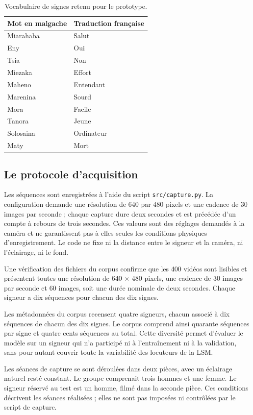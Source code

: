 \begin{table}[ht]
\centering
\small
\caption{Vocabulaire de signes retenu pour le prototype.}
\label{tab:lexique-lsm}
\begin{tabular}{|l|l|}
\hline
Mot en malgache & Traduction française \\
\hline
Miarahaba & Salut \\
Eny & Oui \\
Tsia & Non \\
Miezaka & Effort \\
Maheno & Entendant \\
Marenina & Sourd \\
Mora & Facile \\
Tanora & Jeune \\
Solosaina & Ordinateur \\
Maty & Mort \\
\hline
\end{tabular}
\end{table}

\subsection{Le protocole d'acquisition}

Les séquences sont enregistrées à l'aide du script \texttt{src/capture.py}. La configuration demande une résolution de 640 par 480 pixels et une cadence de 30 images par seconde ; chaque capture dure deux secondes et est précédée d'un compte à rebours de trois secondes. Ces valeurs sont des réglages demandés à la caméra et ne garantissent pas à elles seules les conditions physiques d'enregistrement. Le code ne fixe ni la distance entre le signeur et la caméra, ni l'éclairage, ni le fond.

Une vérification des fichiers du corpus confirme que les 400 vidéos sont lisibles et présentent toutes une résolution de 640 × 480 pixels, une cadence de 30 images par seconde et 60 images, soit une durée nominale de deux secondes. Chaque signeur a dix séquences pour chacun des dix signes.

Les métadonnées du corpus recensent quatre signeurs, chacun associé à dix séquences de chacun des dix signes. Le corpus comprend ainsi quarante séquences par signe et quatre cents séquences au total. Cette diversité permet d'évaluer le modèle sur un signeur qui n'a participé ni à l'entraînement ni à la validation, sans pour autant couvrir toute la variabilité des locuteurs de la LSM.

Les séances de capture se sont déroulées dans deux pièces, avec un éclairage naturel
resté constant. Le groupe comprenait trois hommes et une femme. Le signeur réservé
au test est un homme, filmé dans la seconde pièce. Ces conditions décrivent les
séances réalisées ; elles ne sont pas imposées ni contrôlées par le script de capture.

